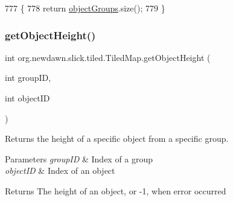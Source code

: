 \begin{DoxyCode}
777                                      \{
778         \textcolor{keywordflow}{return} \mbox{\hyperlink{classorg_1_1newdawn_1_1slick_1_1tiled_1_1_tiled_map_aa446ef4b07ea80ab5f112e8512ed7561}{objectGroups}}.size();
779     \}
\end{DoxyCode}
\mbox{\label{classorg_1_1newdawn_1_1slick_1_1tiled_1_1_tiled_map_a2da39e5d72913b52ebb5a12397724f96}} 
\subsubsection{\texorpdfstring{get\+Object\+Height()}{getObjectHeight()}}
{\footnotesize\ttfamily int org.\+newdawn.\+slick.\+tiled.\+Tiled\+Map.\+get\+Object\+Height (\begin{DoxyParamCaption}\item[{int}]{group\+ID,  }\item[{int}]{object\+ID }\end{DoxyParamCaption})\hspace{0.3cm}{\ttfamily [inline]}}

Returns the height of a specific object from a specific group.


\begin{DoxyParams}{Parameters}
{\em group\+ID} & Index of a group \\
\hline
{\em object\+ID} & Index of an object \\
\hline
\end{DoxyParams}
\begin{DoxyReturn}{Returns}
The height of an object, or -\/1, when error occurred 
\end{DoxyReturn}

